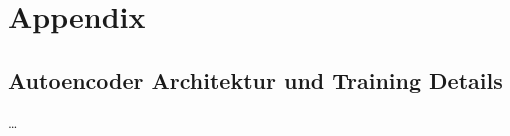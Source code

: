 
\chapter{Appendix}
\label{ch:Appendix}

\section{Autoencoder Architektur und Training Details}

\dots

